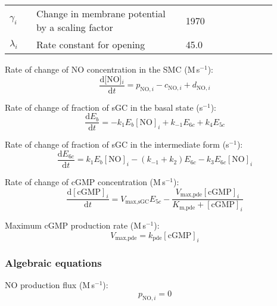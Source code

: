 \documentclass[fleqn]{report}
\numberwithin{equation}{section}
\numberwithin{equation}{section}
\newcommand{\NO}{\text{NO}}
\newcommand{\NOi}{\text{[NO]$_i$}}
\newcommand{\cGMP}{\text{cGMP}}
\newcommand{\uMpers}{\textmu M\,s$^{-1}$}
\newcommand{\n}{$^{-1}$}
\newcommand\pNO[1]{\text{$p_{\text{NO},#1}$}}
\newcommand\cNO[1]{\text{$c_{\text{NO},#1}$}}
\newcommand\dNO[1]{\text{$d_{\text{NO},#1}$}}
\begin{document}
	\begin{table}[h!]
	\centering
	\begin{tabular}{ p{0.09\linewidth}  >{\footnotesize} p{0.5\linewidth}  >{\footnotesize} p{0.27\linewidth} >{\footnotesize} p{0.03\linewidth} }
	\hline
	$\gamma_{i}$				& Change in membrane potential by a scaling factor					& 1970 \mVpuM	& \cite{Koenigsberger2006} \\
	$\lambda_{i} $				& Rate constant for opening											& 45.0 \pers 	& \cite{Koenigsberger2006} \\
	\hline
	\end{tabular}
	\label{tab:dcidt}
	\end{table}
	Rate of change of NO concentration in the SMC (\uMpers):
			    \begin{equation}  
	      			 \dfrac{\mathrm{d}\NOi}{\mathrm{d}t} = \pNO{i} - \cNO{i} + \dNO{i} 
				\end{equation}
				
				Rate of change of fraction of sGC in the basal state (s\n):%
				\begin{equation} 
					\dfrac{\mathrm{d}E_b}{\mathrm{d}t} = -k_1 E_b [\NO]_i + k_{-1} E_{6c} + k_4 E_{5c}
				\end{equation}	
				
				Rate of change of fraction of sGC in the intermediate form (s\n):%
				\begin{equation} 
					\dfrac{\mathrm{d}E_{6c}}{\mathrm{d}t} = k_1 E_b [\NO]_i - (k_{-1} + k_2) E_{6c} - k_3 E_{6c} [\NO]_i
				\end{equation}	
	
				Rate of change of cGMP concentration (\uMpers):		%
				\begin{equation} 
					\dfrac{\mathrm{d}[\cGMP]_i}{\mathrm{d}t} = V_{\text{max,sGC}} E_{5c} - \frac{V_{\text{max,pde}}[\cGMP]_i}{K_{\text{m,pde}}+[\cGMP]_i}
				\end{equation}	
				
				
					Maximum cGMP production rate (\uMpers):
								\begin{equation}
									V_{\text{max,pde}} = k_{\text{pde}} [\text{cGMP}]_i
								\end{equation}
	       		
			\subsubsection*{Algebraic equations}
				NO production flux (\uMpers):
				\begin{equation} 
					\pNO{i} = 0
				\end{equation}
			
\end{document}
